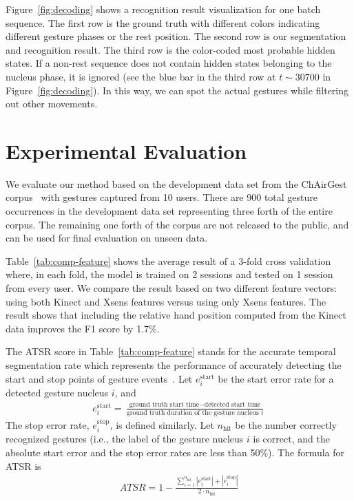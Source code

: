 \documentclass{sig-alternate-2013}
\begin{document}
Figure~\ref{fig:decoding} shows a recognition result visualization for one batch sequence. The first
row is the ground truth with different colors indicating different gesture phases or the rest position. 
The second row is our segmentation and recognition result.
The third row is the color-coded most probable hidden states. If a non-rest sequence does not contain hidden states belonging to the nucleus phase, 
it is ignored (see the blue bar in the third row at $t\sim 30700$ in Figure~\ref{fig:decoding}). In
this way, we can spot the actual gestures while filtering out other movements.

\section{Experimental Evaluation}\label{sec:eval}
We evaluate our method based on the development data set from the ChAirGest
corpus~\cite{Ruffieux2013} with gestures captured from 10 users. There are 900
total gesture occurrences in the development data set representing three forth
of the entire corpus. The remaining one forth of the corpus are not released to
the public, and can be used for final evaluation on unseen data.

Table~\ref{tab:comp-feature} shows the average result of a 3-fold cross validation where, in each fold,
the model is trained on 2 sessions and tested on 1 session from every user. We compare
the result based on two different feature vectors: using both Kinect and Xsens features versus using
only Xsens features. The result shows that including the relative hand position computed from 
the Kinect data improves the F1 score by 1.7\%. 

The ATSR score in Table~\ref{tab:comp-feature} stands for the accurate temporal
segmentation rate which represents the performance of accurately
detecting the start and stop points of gesture events~\cite{Ruffieux2013}.
Let $e^\text{start}_i$ be the start error rate for a detected gesture nucleus
$i$, and
\begin{align*}
e^\text{start}_i = \frac{\text{ground truth start time} - \text{detected start
time}}{\text{ground truth duration of the gesture nucleus }i}
\end{align*}
The stop error rate, $e_i^\text{stop}$, is defined similarly.
Let $n_{\text{hit}}$ be the number correctly recognized gestures (i.e., the
label of the gesture nucleus $i$ is correct, and the absolute start error and
the stop error rates are less than 50\%). The formula for ATSR
is
\begin{align*}
ATSR = 1 - \frac{\sum_{i = 1}^{n_{\text{hit}}} |e^\text{start}_i| +
|e_i^\text{stop}|}{2\cdot n_{\text{hit}}}
\end{align*}
\end{document}
